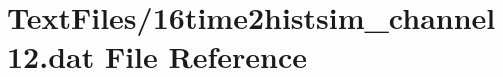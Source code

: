 \hypertarget{16time2histsim__channel12_8dat}{}\section{Text\+Files/16time2histsim\+\_\+channel12.dat File Reference}
\label{16time2histsim__channel12_8dat}

